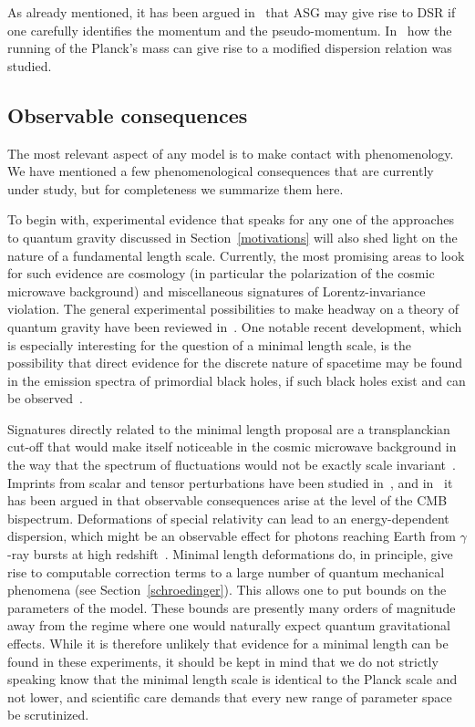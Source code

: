\documentclass{article}
\begin{document}
As already mentioned, it has been argued in~\cite{Calmet:2010tx} that {\sc ASG} may give rise to
{\sc DSR} if one carefully identifies the momentum and the pseudo-momentum. In~\cite{Girelli:2006sc} how the running of the Planck's mass can give rise to a modified dispersion relation was studied.  


\subsection{Observable consequences}

The most relevant aspect of any model is to make contact with phenomenology. We have mentioned a
few phenomenological consequences that are currently under study, but for completeness we 
summarize them here. 

To begin with, experimental evidence that speaks for any one of the approaches to quantum
gravity discussed in Section~\ref{motivations} will also shed light on the nature of a
fundamental length scale. Currently, the most promising areas
to look for such evidence are cosmology (in particular the polarization of the cosmic 
microwave background) and miscellaneous signatures of Lorentz-invariance violation. 
The general experimental possibilities to make headway on a theory of quantum gravity
have been reviewed in~\cite{AmelinoCamelia:2008qg, Hossenfelder:2010zj}. One notable
recent development, which is especially interesting for the question of a minimal length
scale, is the possibility that direct evidence for the discrete nature of
spacetime may be found in the emission spectra of primordial black holes, if such black holes exist and
can be observed~\cite{Barrau:2011md}.

Signatures directly related to the minimal length proposal are a transplanckian cut-off
that would make itself noticeable in the cosmic microwave background in the way that the spectrum of fluctuations would not be
exactly scale invariant~\cite{Martin:2000xs, Brandenberger:2002nq}. Imprints from
scalar and tensor perturbations have been studied
in~\cite{Ashoorioon:2004vm, Ashoorioon:2004wd, Ashoorioon:2005ep}, and
in~\cite{Chialva:2011iz, Chialva:2011hc} it has been argued in that observable consequences 
arise at the level of the {\sc CMB} bispectrum. Deformations of special relativity 
can lead to an energy-dependent dispersion, which might be an observable effect for photons
reaching Earth from $\gamma$-ray bursts at high
redshift~\cite{AmelinoCamelia:1999pm, AmelinoCamelia:2008qg, AmelinoCamelia:2010pd}. Minimal length
deformations do, in principle, give rise to computable correction terms to a large number
of quantum mechanical phenomena (see Section~\ref{schroedinger}). This allows one to put bounds on the
parameters of the model. These bounds are presently many orders of magnitude
away from the regime where one would naturally expect quantum gravitational effects.
While it is therefore unlikely that evidence for a minimal length can be found in these
experiments, it should be kept in mind that we do not strictly speaking know that the
minimal length scale is identical to the Planck scale and not lower, and scientific care
demands that every new range of parameter space be scrutinized.
\end{document}
